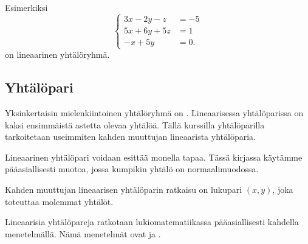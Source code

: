 Esimerkiksi
\[
\left\{
\begin{aligned}
3x-2y-z&= -5 \\
5x+6y+5z&= 1 \\
-x+5y&= 0.
\end{aligned}
\right.
\]
on lineaarinen yhtälöryhmä. 


\subsection*{Yhtälöpari}

Yksinkertaisin mielenkiintoinen yhtälöryhmä on
.
Lineaarisessa yhtälöparissa on kaksi ensimmäistä astetta olevaa yhtälöä.
Tällä kurssilla yhtälöparilla tarkoitetaan useimmiten kahden muuttujan lineaarista yhtälöparia.

Lineaarinen yhtälöpari voidaan esittää monella tapaa. Tässä
kirjassa käytämme pääasiallisesti muotoa, jossa kumpikin yhtälö on normaalimuodossa.


Kahden muuttujan lineaarisen yhtälöparin ratkaisu on lukupari $(x, y)$, joka toteuttaa molemmat yhtälöt.

Lineaarisia yhtälöpareja ratkotaan lukiomatematiikassa pääasiallisesti kahdella menetelmällä.
Nämä menetelmät ovat  ja
.

